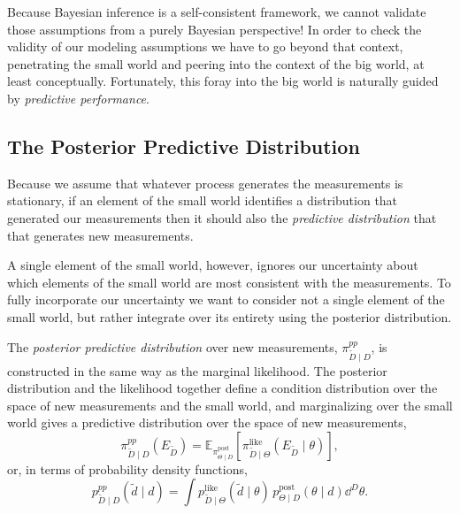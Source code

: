 Because Bayesian inference is a self-consistent framework, 
we cannot validate those assumptions from a purely Bayesian 
perspective! In order to check the validity of our modeling 
assumptions we have to go beyond that context, penetrating
the small world and peering into the context of the big world, 
at least conceptually.  Fortunately, this foray into the big world 
is naturally guided by \emph{predictive performance}.

\subsection{The Posterior Predictive Distribution}

Because we assume that whatever process generates the 
measurements is stationary, if an element of the small world
identifies a distribution that generated our measurements
then it should also the \emph{predictive distribution} that 
that generates new measurements.

A single element of the small world, however, ignores our
uncertainty about which elements of the small world are most
consistent with the measurements.  To fully incorporate our 
uncertainty we want to consider not a single element of the small 
world, but rather integrate over its entirety using the posterior 
distribution.  

The \emph{posterior predictive distribution} over new measurements,
$\pi_{\widetilde{D} \mid D}^{pp}$, is constructed in the same way
as the marginal likelihood.  The posterior distribution and the likelihood 
together define a condition distribution over the space of new
measurements and the small world, and marginalizing over the
small world gives a predictive distribution over the space of new 
measurements,
%
\begin{equation*}
\pi_{\widetilde{D} \mid D}^{pp} \! \left( E_{\widetilde{D}} \right)
=
\mathbb{E}_{\pi_{\Theta \mid D}^{\mathrm{post}}} \! \left[  
\pi_{\widetilde{D} \mid \Theta}^{\mathrm{like}} \! \left( E_{\widetilde{D}} 
\mid \theta \right)
\right],
\end{equation*}
%
or, in terms of probability density functions, 
%
\begin{equation*}
p_{\widetilde{D} \mid D}^{pp} ( \tilde{d} \mid d )  = 
\int p_{\widetilde{D} \mid \Theta}^{\mathrm{like}} ( \tilde{d} \mid \theta ) \,
p_{\Theta \mid D}^{\mathrm{post}} \! \left( \theta \mid d \right) \dd^{D} \theta.
\end{equation*}

